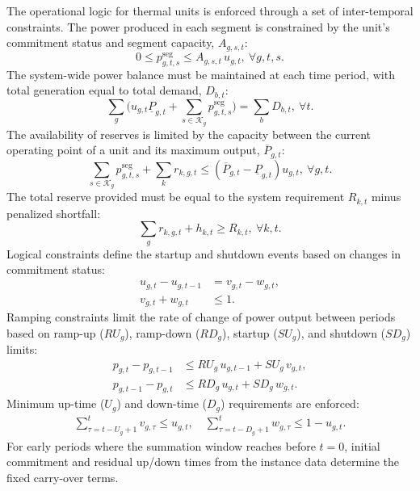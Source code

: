 \documentclass[runningheads]{llncs}
\begin{document}
The operational logic for thermal units is enforced through a set of inter-temporal constraints. The power produced in each segment is constrained by the unit's commitment status and segment capacity, $A_{g,s,t}$:
\begin{equation}
0\le p^{\mathrm{seg}}_{g,t,s} \le A_{g,s,t}\,u_{g,t}, \ \forall g,t,s. \label{eq:seg-link}
\end{equation}
The system-wide power balance must be maintained at each time period, with total generation equal to total demand, $D_{b,t}$:
\begin{equation}
\sum_{g}\Big(u_{g,t}\underline{P}_{g,t}+\sum_{s\in \mathcal{K}_g}p^{\mathrm{seg}}_{g,t,s}\Big)=\sum_{b}D_{b,t}, \ \forall t. \label{eq:balance}
\end{equation}
The availability of reserves is limited by the capacity between the current operating point of a unit and its maximum output, $\overline{P}_{g,t}$:
\begin{equation}
\sum_{s\in \mathcal{K}_g}p^{\mathrm{seg}}_{g,t,s}+\sum_{k}r_{k,g,t}\le (\overline{P}_{g,t}-\underline{P}_{g,t})u_{g,t}, \ \forall g,t. \label{eq:res-head}
\end{equation}
The total reserve provided must be equal to the system requirement $R_{k,t}$ minus penalized shortfall:
\begin{equation}
\sum_{g}r_{k,g,t} + h_{k,t} \ge R_{k,t}, \ \forall k,t. \label{eq:res-req}
\end{equation}
Logical constraints define the startup and shutdown events based on changes in commitment status:
\begin{align}
u_{g,t}-u_{g,t-1} &= v_{g,t}-w_{g,t}, \label{eq:su-def}\\
v_{g,t}+w_{g,t} &\le 1. \label{eq:su-excl}
\end{align}
Ramping constraints limit the rate of change of power output between periods based on ramp-up ($RU_g$), ramp-down ($RD_g$), startup ($SU_g$), and shutdown ($SD_g$) limits:
\begin{align}
p_{g,t}-p_{g,t-1} &\le RU_g\,u_{g,t-1} + SU_g\,v_{g,t}, \label{eq:ramp-up}\\
p_{g,t-1}-p_{g,t} &\le RD_g\,u_{g,t} + SD_g\,w_{g,t}. \label{eq:ramp-dn}
\end{align}
Minimum up-time ($U_g$) and down-time ($D_g$) requirements are enforced:
\begin{align}
\sum_{\tau=t-U_g+1}^{t} v_{g,\tau} \le u_{g,t}, \quad
\sum_{\tau=t-D_g+1}^{t} w_{g,\tau} \le 1-u_{g,t}. \label{eq:min-ud}
\end{align}
For early periods where the summation window reaches before $t=0$, initial commitment and residual up/down times from the instance data determine the fixed carry-over terms.
\end{document}
